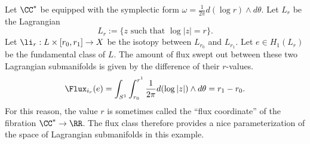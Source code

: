 

    Let $\CC^*$ be equipped with the symplectic form $\omega=\frac{1}{2\pi} d(\log r) \wedge d\theta$. 
    Let $L_r$ be the Lagrangian  
        \[L_r:=\{z \text{ such that } \log|z|=r\}.\]
    Let $\li_r:L\times [r_0, r_1]\to X$ be the isotopy between $L_{r_0}$ and $L_{r_1}$. 
    Let $e\in H_1(L_r)$ be the fundamental class of $L$. 
    The amount of flux swept out between these two Lagrangian submanifolds is given by the difference of their $r$-values. 
    \[\Flux_{i_r}(e)=\int_{S^1} \int_{r_0}^{r^1} \frac{1}{2\pi} d(\log |z|)\wedge d\theta = r_1-r_0.\]
    For this reason, the value $r$ is sometimes called the ``flux coordinate'' of the fibration $\CC^*\to \RR$.
    The flux class therefore provides a nice parameterization of the space of Lagrangian submanifolds in this example. 

